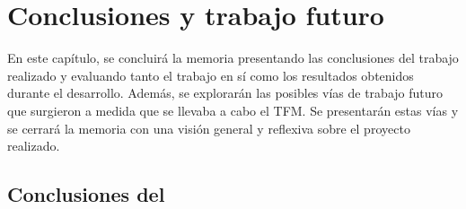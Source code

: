 \chapter{Conclusiones y trabajo futuro}
\label{conclusiones}

En este capítulo, se concluirá la memoria presentando las conclusiones del trabajo realizado y evaluando tanto el trabajo en sí como los resultados obtenidos durante el desarrollo. Además, se explorarán las posibles vías de trabajo futuro que surgieron a medida que se llevaba a cabo el TFM. Se presentarán estas vías y se cerrará la memoria con una visión general y reflexiva sobre el proyecto realizado.


\section{Conclusiones del }

